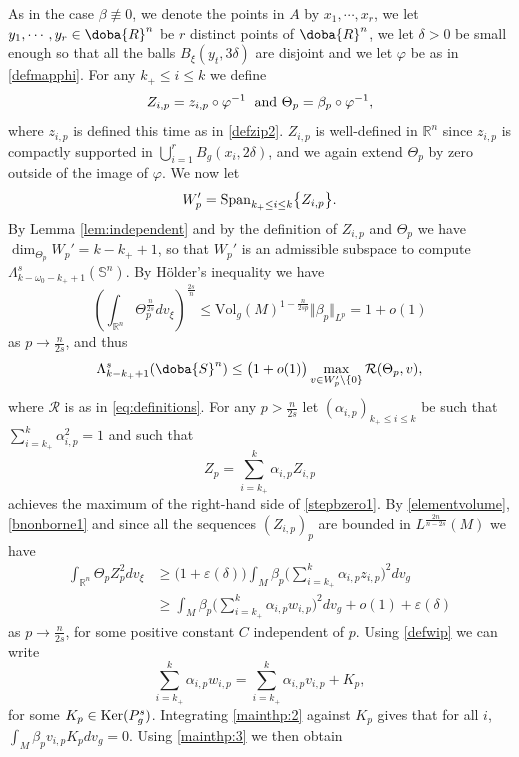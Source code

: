 \documentclass[10pt]{amsart}
\numberwithin{equation}{section}
\newcommand{\R}{\mathbb{R}}
\def\al{{\alpha}}
\def\La{{\Lambda}}
\def\be{{\beta}}
\def\phi{{\varphi}}
\gdef\mR{\doba{R}}
\gdef\mS{\doba{S}}
\def\ker{{\mathop{\rm Ker}}}
\def\span{{\mathop{\rm Span}}}
\newcommand{\ve}{\varepsilon}
\newcommand{\vp}{\varphi}
\theoremstyle{plain}
\theoremstyle{remark}
\begin{document}
As in the case $\beta \not \equiv 0$, we denote the points in $A$ by $x_1, \cdots, x_r$, we let $y_1, \cdots, y_r \in \mR^n$ be $r$ distinct points of $\mR^n$, we let $\delta >0$ be small enough so that all the balls $B_{\xi}(y_t, 3\delta)$ are disjoint and we let $\vp$ be as in \eqref{defmapphi}. For any $k_+ \le i \le k$ we define
$$Z_{i,p}= z_{i,p} \circ \phi^{-1} \; \hbox{ and } \Theta_p= \beta_p \circ \phi^{-1},$$
where $z_{i,p}$ is defined this time as in  \eqref{defzip2}. $Z_{i,p}$ is well-defined in $\R^n$ since $z_{i,p}$ is compactly supported in $\bigcup_{i=1}^r B_g(x_i,2 \delta)$, and we again extend $\Theta_p$ by zero outside of the image of $\phi$. We now let 
$$W_p' = \span_{k_+ \le i \le k }  \big\{ Z_{i,p} \big\}. $$
By Lemma \ref{lem:independent} and by the definition of $Z_{i,p}$ and $\Theta_p$ we have $\dim_{\Theta_p} W_p' = k-k_++1$, so that $W_p'$ is an admissible subspace to compute $\Lambda_{k-\omega_0 -k_++1}^s (\mathbb{S}^n)$. By H\"older's inequality we have
$$\left( \int_{\R^n} \Theta_p^{\frac{n}{2s}} dv_\xi\right)^{\frac{2s}{n}} \le \text{Vol}_g(M)^{1 - \frac{n}{2sp}} \Vert \beta_p \Vert_{L^p} = 1+ o(1) $$
as $p \to \frac{n}{2s}$, and thus
\begin{equation} \label{stepbzero1}
\La_{k-k_++1}^s(\mS^n) \leq \big( 1 + o(1) \big) \max_{v \in W_p' \backslash \{0\}} \mathcal{R}(\Theta_p,v), %
\end{equation} 
where $\mathcal{R}$ is as in \eqref{eq:definitions}. For any $p > \frac{n}{2s}$ let $(\al_{i,p})_{k_+ \le i \le k}$ be such that $\sum_{i=k_+}^k \al_{i,p}^2=1$ and such that 
$$Z_p= \sum_{i =k_+}^k \al_{i,p} Z_{i,p}$$
achieves the maximum of the right-hand side of \eqref{stepbzero1}. By \eqref{elementvolume}, \eqref{bnonborne1} and since all the sequences $(Z_{i,p})_p$ are bounded in $L^{\frac{2n}{n-2s}}(M)$  we have 
$$\begin{aligned}
 \int_{\R^n} \Theta_p Z_p^2 dv_{\xi} & \ge \big(1 + \ve(\delta) \big) \int_M \beta_p \big(  \sum_{i =k_+}^k \al_{i,p} z_{i,p} \big)^2 dv_g  \\
 & \ge \int_M \beta_p \big(  \sum_{i =k_+}^k \al_{i,p} w_{i,p} \big)^2 dv_g + o(1) + \ve(\delta)
  \end{aligned} $$
as $p \to \frac{n}{2s}$, for some positive constant $C$ independent of $p$. Using \eqref{defwip} we can write 
$$ \sum_{i =k_+}^k \al_{i,p} w_{i,p} = \sum_{i =k_+}^k  \al_{i,p} v_{i,p}  + K_p,$$ 
for some $K_p \in \ker(P_g^s)$. Integrating \eqref{mainthp:2} against $K_p$ gives that for all $i$, $\int_M \be_p v_{i,p} K_p dv_g=0$. Using \eqref{mainthp:3} we then obtain 
\end{document}
